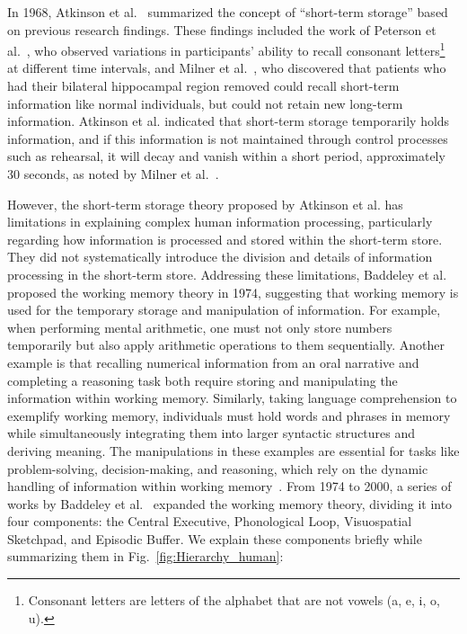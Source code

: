 \documentclass[journal,hideappendix]{vgtc}
\begin{document}
In 1968, Atkinson et al.~\cite{atkinson1968human} summarized the concept of ``short-term storage'' based on previous research findings. These findings included the work of Peterson et al.~\cite{peterson1959short}, who observed variations in participants' ability to recall consonant letters\footnote{Consonant letters are letters of the alphabet that are not vowels (a, e, i, o, u).} at different time intervals, and Milner et al.~\cite{milner1959memory, milner1966amnesia, milner1966neuropsychological}, who discovered that patients who had their bilateral hippocampal region removed could recall short-term information like normal individuals, but could not retain new long-term information. Atkinson et al. indicated that short-term storage temporarily holds information, and if this information is not maintained through control processes such as rehearsal, it will decay and vanish within a short period, approximately 30 seconds, as noted by Milner et al.~\cite{milner1966neuropsychological}.


However, the short-term storage theory proposed by Atkinson et al. has limitations in explaining complex human information processing, particularly regarding how information is processed and stored within the short-term store. They did not systematically introduce the division and details of information processing in the short-term store. Addressing these limitations, Baddeley et al.~\cite{baddeley1974working} proposed the working memory theory in 1974, suggesting that working memory is used for the temporary storage and manipulation of information. For example, when performing mental arithmetic, one must not only store numbers temporarily but also apply arithmetic operations to them sequentially. 
Another example is that recalling numerical information from an oral narrative and completing a reasoning task both require storing and manipulating the information within working memory.
Similarly, taking language comprehension to exemplify working memory, individuals must hold words and phrases in memory while simultaneously integrating them into larger syntactic structures and deriving meaning.
The manipulations in these examples are essential for tasks like problem-solving, decision-making, and reasoning, which rely on the dynamic handling of information within working memory~\cite{baddeley1974working}. From 1974 to 2000, a series of works by Baddeley et al.~\cite{baddeley1974working,baddeley1986working,baddeley2000episodic} expanded the working memory theory, dividing it into four components: the Central Executive, Phonological Loop, Visuospatial Sketchpad, and Episodic Buffer. 
We explain these components briefly while summarizing them in Fig.~\ref{fig:Hierarchy_human}:
\end{document}
